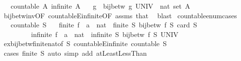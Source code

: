 \begin{isabellebody}
\ \ \ {\isachardoublequoteopen}countable\ A{\isachardoublequoteclose}\ {\isachardoublequoteopen}infinite\ A{\isachardoublequoteclose}\isanewline
\ \ \ g\ \ {\isachardoublequoteopen}bij{\isacharunderscore}betw\ g\ {\isacharparenleft}UNIV\ {\isacharcolon}{\isacharcolon}\ nat\ set{\isacharparenright}\ A{\isachardoublequoteclose}\isanewline
%
\isadelimproof
\ \ %
\endisadelimproof
%
\isatagproof
{}\isamarkupfalse%
\ bij{\isacharunderscore}betw{\isacharunderscore}inv{\isacharbrackleft}OF\ countableE{\isacharunderscore}infinite{\isacharbrackleft}OF\ assms{\isacharbrackright}{\isacharbrackright}\ that\ \isamarkupfalse%
\ blast%
\endisatagproof
{\isafoldproof}%
%
\isadelimproof
\isanewline
%
\endisadelimproof
\isanewline
{}\isamarkupfalse%
\ countable{\isacharunderscore}enum{\isacharunderscore}cases{\isacharcolon}\isanewline
\ \ \ {\isachardoublequoteopen}countable\ S{\isachardoublequoteclose}\isanewline
\ \ \ {\isacharparenleft}finite{\isacharparenright}\ f\ {\isacharcolon}{\isacharcolon}\ {\isachardoublequoteopen}{\isacharprime}a\ {\isasymRightarrow}\ nat{\isachardoublequoteclose}\ \ {\isachardoublequoteopen}finite\ S{\isachardoublequoteclose}\ {\isachardoublequoteopen}bij{\isacharunderscore}betw\ f\ S\ {\isacharbraceleft}{\isachardot}{\isachardot}{\isacharless}card\ S{\isacharbraceright}{\isachardoublequoteclose}\isanewline
\ \ \ \ \ \ \ \ {\isacharbar}\ {\isacharparenleft}infinite{\isacharparenright}\ f\ {\isacharcolon}{\isacharcolon}\ {\isachardoublequoteopen}{\isacharprime}a\ {\isasymRightarrow}\ nat{\isachardoublequoteclose}\ \ {\isachardoublequoteopen}infinite\ S{\isachardoublequoteclose}\ {\isachardoublequoteopen}bij{\isacharunderscore}betw\ f\ S\ UNIV{\isachardoublequoteclose}\isanewline
%
\isadelimproof
\ \ %
\endisadelimproof
%
\isatagproof
{}\isamarkupfalse%
\ ex{\isacharunderscore}bij{\isacharunderscore}betw{\isacharunderscore}finite{\isacharunderscore}nat{\isacharbrackleft}of\ S{\isacharbrackright}\ countableE{\isacharunderscore}infinite\ {\isacartoucheopen}countable\ S{\isacartoucheclose}\isanewline
\ \ \isamarkupfalse%
\ {\isacharparenleft}cases\ {\isachardoublequoteopen}finite\ S{\isachardoublequoteclose}{\isacharparenright}\ {\isacharparenleft}auto\ simp\ add{\isacharcolon}\ atLeast{}LessThan{\isacharparenright}%
\endisatagproof
{\isafoldproof}%
%
\isadelimproof
\isanewline
%
\endisadelimproof
\isanewline
{}\isamarkupfalse%

\end{isabellebody}
